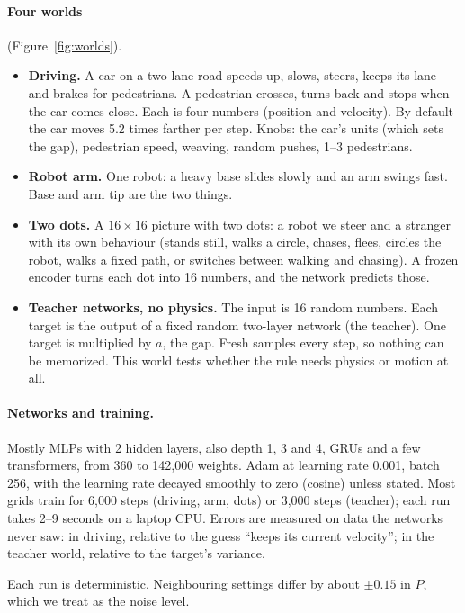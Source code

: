 \documentclass[11pt]{article}
\newcommand{\para}[1]{\paragraph{#1}}
\begin{document}
\para{Four worlds} (Figure~\ref{fig:worlds}).
\begin{itemize}
\item \textbf{Driving.} A car on a two-lane road speeds up, slows, steers, keeps its lane and brakes for pedestrians. A pedestrian crosses, turns back and stops when the car comes close. Each is four numbers (position and velocity). By default the car moves 5.2 times farther per step. Knobs: the car's units (which sets the gap), pedestrian speed, weaving, random pushes, 1--3 pedestrians.
\item \textbf{Robot arm.} One robot: a heavy base slides slowly and an arm swings fast. Base and arm tip are the two things.
\item \textbf{Two dots.} A $16\times16$ picture with two dots: a robot we steer and a stranger with its own behaviour (stands still, walks a circle, chases, flees, circles the robot, walks a fixed path, or switches between walking and chasing). A frozen encoder turns each dot into 16 numbers, and the network predicts those.
\item \textbf{Teacher networks, no physics.} The input is 16 random numbers. Each target is the output of a fixed random two-layer network (the teacher). One target is multiplied by $a$, the gap. Fresh samples every step, so nothing can be memorized. This world tests whether the rule needs physics or motion at all.
\end{itemize}

\para{Networks and training.} Mostly MLPs with 2 hidden layers, also depth 1, 3 and 4, GRUs and a few transformers, from 360 to 142,000 weights. Adam at learning rate 0.001, batch 256, with the learning rate decayed smoothly to zero (cosine) unless stated. Most grids train for 6,000 steps (driving, arm, dots) or 3,000 steps (teacher); each run takes 2--9 seconds on a laptop CPU. Errors are measured on data the networks never saw: in driving, relative to the guess ``keeps its current velocity''; in the teacher world, relative to the target's variance.

Each run is deterministic. Neighbouring settings differ by about $\pm0.15$ in $P$, which we treat as the noise level.
\end{document}
